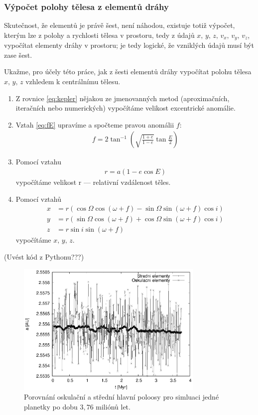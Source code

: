 \documentclass[A4paper, 12pt, oneside]{book}
\begin{document}
\subsubsection{Výpočet polohy tělesa z elementů dráhy}
Skutečnost, že elementů je právě šest, není náhodou, existuje totiž výpočet, kterým lze z polohy a rychlosti tělesa v prostoru, tedy z údajů $x,\, y,\, z,\, v_x,\, v_y,\, v_z$, vypočítat elementy dráhy v prostoru; je tedy logické, že vzniklých údajů musí být zase šest. 

Ukažme, pro účely této práce, jak z šesti elementů dráhy vypočítat polohu tělesa $x,\, y,\, z$ vzhledem k centrálnímu tělesu.

\begin{enumerate}[label=\arabic*.]
	\item Z rovnice \eqref{eq:kepler} nějakou ze jmenovanných metod (aproximačních, iteračních nebo numerických) vypočítáme velikost excentrické anomálie.
	\item Vztah \eqref{eq:fE} upravíme a spočteme pravou anomálii $f$:
		\begin{align}
			f = 2\tan^{-1}(\sqrt{\frac{1+e}{1-e}}\tan \frac{E}{2})
		\end{align}
	\item Pomocí vztahu 
		\begin{align}
			r=a(1-e\cos E)
		\end{align}
		vypočítáme velikost r --- relativní vzdálenost těles.
	\item Pomocí vztahů
		\begin{align}
			x&=r(\cos\Omega\cos(\omega+f)-\sin\Omega\sin(\omega+f)\cos i) \\
			y&=r(\sin\Omega\cos(\omega+f)+\cos\Omega\sin(\omega+f)\cos i) \\
			z&=r\sin i\sin(\omega+f)
		\end{align}
		vypočítáme $x,\,y,\,z$.
\end{enumerate}

(Uvést kód z Pythonu???)

\begin{figure}[!htb]
	\centering
	\includegraphics[width=0.8\textwidth]{obr/atOF}
	\caption{Porovnání oskulační a střední hlavní poloosy pro simluaci jedné planetky po dobu $3,76$ miliónů let.}
	\label{atOF}
\end{figure}
\end{document}
